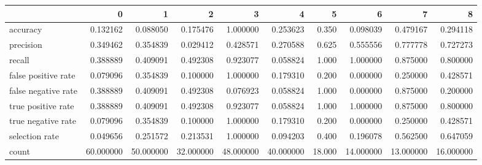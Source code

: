 \begin{tabular}{lrrrrrrrrr}
\toprule
{} &          0 &          1 &          2 &          3 &          4 &       5 &          6 &          7 &          8 \\
\midrule
accuracy            &   0.132162 &   0.088050 &   0.175476 &   1.000000 &   0.253623 &   0.350 &   0.098039 &   0.479167 &   0.294118 \\
precision           &   0.349462 &   0.354839 &   0.029412 &   0.428571 &   0.270588 &   0.625 &   0.555556 &   0.777778 &   0.727273 \\
recall              &   0.388889 &   0.409091 &   0.492308 &   0.923077 &   0.058824 &   1.000 &   1.000000 &   0.875000 &   0.800000 \\
false positive rate &   0.079096 &   0.354839 &   0.100000 &   1.000000 &   0.179310 &   0.200 &   0.000000 &   0.250000 &   0.428571 \\
false negative rate &   0.388889 &   0.409091 &   0.492308 &   0.076923 &   0.058824 &   1.000 &   0.000000 &   0.875000 &   0.200000 \\
true positive rate  &   0.388889 &   0.409091 &   0.492308 &   0.923077 &   0.058824 &   1.000 &   1.000000 &   0.875000 &   0.800000 \\
true negative rate  &   0.079096 &   0.354839 &   0.100000 &   1.000000 &   0.179310 &   0.200 &   0.000000 &   0.250000 &   0.428571 \\
selection rate      &   0.049656 &   0.251572 &   0.213531 &   1.000000 &   0.094203 &   0.400 &   0.196078 &   0.562500 &   0.647059 \\
count               &  60.000000 &  50.000000 &  32.000000 &  48.000000 &  40.000000 &  18.000 &  14.000000 &  13.000000 &  16.000000 \\
\bottomrule
\end{tabular}
